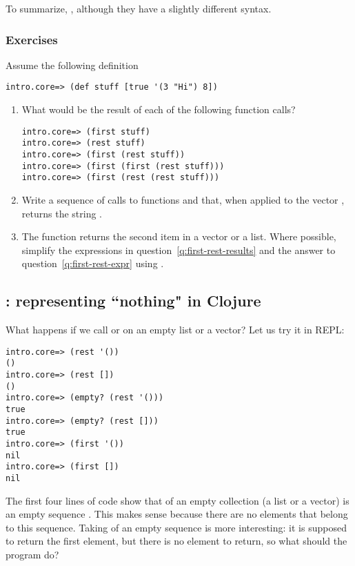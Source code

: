 To summarize, , although they have a slightly different syntax.  

\subsubsection{Exercises}\label{subsub:lists-vectors-exercises}
\begin{exercise}\label{ex:lists-vectors}
Assume the following definition
\begin{framed}
\begin{verbatim}
intro.core=> (def stuff [true '(3 "Hi") 8])
\end{verbatim}
\end{framed}
\begin{enumerate}
\item\label{q:first-rest-results} What would be the result of each of the following function calls? 
\begin{framed}
\begin{verbatim}
intro.core=> (first stuff)
intro.core=> (rest stuff)
intro.core=> (first (rest stuff))
intro.core=> (first (first (rest stuff)))
intro.core=> (first (rest (rest stuff)))
\end{verbatim}
\end{framed}
\item\label{q:first-rest-expr} Write a sequence of calls to functions  and  that, when applied to the vector , returns the string . 
\item\label{q:second} The function  returns the second item in a vector or a list. Where possible, simplify the expressions in question~\ref{q:first-rest-results} and the answer to question~\ref{q:first-rest-expr} using .
\end{enumerate}
\end{exercise}

\subsection{: representing ``nothing" in Clojure}\label{subsec:nil}
What happens if we call  or  on an empty list or a vector?  Let us try it in REPL:
\begin{framed}
\begin{verbatim}
intro.core=> (rest '())
()
intro.core=> (rest [])
()
intro.core=> (empty? (rest '()))
true
intro.core=> (empty? (rest []))
true
intro.core=> (first '())
nil
intro.core=> (first [])
nil
\end{verbatim}
\end{framed}
The first four lines of code show that  of an empty collection (a list or a vector) is an empty sequence \clocode{()}. This makes sense because there are no elements that belong to this sequence. Taking  of an empty sequence is more interesting: it is supposed to return the first element, but there is no element to return, so what should the program do? 

